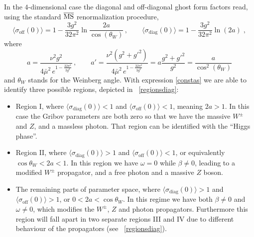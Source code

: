 In the $4$-dimensional case the diagonal and off-diagonal ghost form factors read, using the standard $\overline{\mbox{MS}}$ renormalization procedure,
\begin{equation}
\label{constas} 
\langle \sigma_\text{off}(0) \rangle = 1 - \frac{3g^{2}}{32\pi^{2}}\ln\frac{2a}{\cos(\theta_{W})}
\,, \qquad
\langle \sigma_\text{diag}(0) \rangle = 1-\frac{3g^{2}}{32\pi^{2}}\ln(2a)\;,
\end{equation}
where
\begin{equation}
\label{consta} a = \frac{\nu^{2}g^{2}}{4\bar{\mu}^{2}\,e^{1-\frac{32 \pi^{2}}{3g^{2}}}}\,, \qquad a' = \frac{\nu^{2}(g^{2}+g'^{2})}{4\bar{\mu}^{2}\,e^{1-\frac{32 \pi^{2}}{3g^{2}}}} = a \frac{g^{2}+g'^{2}}{g^{2}} = \frac{a}{\cos^{2}(\theta_{W})}
\end{equation}
and $\theta_{W}$ stands for the Weinberg angle. With expression \eqref{constas} we are able to identify three possible regions, depicted in \figurename\ \ref{regionsdiag}:
\begin{itemize}
\item Region I, where $\langle \sigma_\text{diag}(0)\rangle < 1$ and $\langle \sigma_\text{off}(0)\rangle < 1$, meaning $2a > 1$. In this case the Gribov parameters are both zero so that we have the massive $W^{\pm}$ and $Z$, and a massless photon. That region can be identified with the ``Higgs phase''.
\item Region II, where $\langle \sigma_\text{diag}(0)\rangle > 1$ and $\langle \sigma_\text{off}(0)\rangle < 1$, or equivalently $\cos \theta_{W} < 2a < 1$. In this region we have $\omega = 0$ while $\beta \neq 0$, leading to a modified $W^{\pm}$ propagator, and a free photon and a massive $Z$ boson.
\item The remaining parts of parameter space, where $\langle \sigma_\text{diag}(0)\rangle > 1$ and $\langle \sigma_\text{off}(0)\rangle > 1$, or $0 < 2a < \cos\theta_{W}$. In this regime we have both $\beta \neq 0$ and $\omega \neq 0$, which modifies the $W^{\pm}$, $Z$ and photon propagators. Furthermore this region will fall apart in two separate regions III and IV due to different behaviour of the propagators (see \figurename\ \ref{regionsdiag}).
\end{itemize}

















